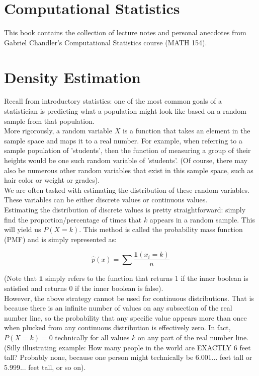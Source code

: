 \documentclass[12pt]{article}
\begin{document}
\section*{Computational Statistics}

This book contains the collection of lecture notes and personal anecdotes from Gabriel Chandler's Computational Statistics course (MATH 154). 

\section{Density Estimation}
Recall from introductory statistics: one of the most common goals of a statistician is predicting what a population might look like based on a random sample from that population. \\

More rigorously, a random variable $X$ is a function that takes an element in the sample space and maps it to a real number. For example, when referring to a sample population of 'students', then the function of measuring a group of their heights would be one such random variable of 'students'. (Of course, there may also be numerous other random variables that exist in this sample space, such as hair color or weight or grades). \\

We are often tasked with estimating the distribution of these random variables. These variables can be either discrete values or continuous values. \\

Estimating the distribution of discrete values is pretty straightforward: simply find the proportion/percentage of times that $k$ appears in a random sample. This will yield us $P(X = k)$. This method is called the probability mass function (PMF) and is simply represented as: 


$$\hat{p}(x) = \sum \frac{\mathbf{1}(x_i = k)}{n}$$ 

(Note that $\mathbf{1}$ simply refers to the function that returns 1 if the inner boolean is satisfied and returns 0 if the inner boolean is false). \\

However, the above strategy cannot be used for continuous distributions. That is because there is an infinite number of values on any subsection of the real number line, so the probability that any specific value appears more than once when plucked from any continuous distribution is effectively zero. In fact, $P(X = k) = 0$ technically for all values $k$ on any part of the real number line. (Silly illustrating example: How many people in the world are EXACTLY 6 feet tall? Probably none, because one person might technically be 6.001... feet tall or 5.999... feet tall, or so on). \\
\end{document}
